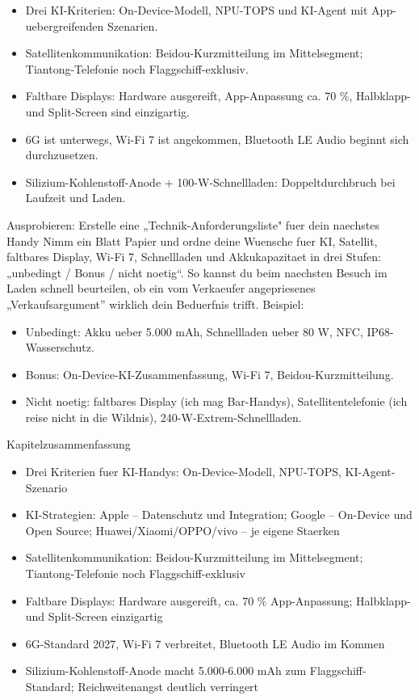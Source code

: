 
\begin{itemize}
  \item Drei KI-Kriterien: On-Device-Modell, NPU-TOPS und KI-Agent mit App-uebergreifenden Szenarien.
  \item Satellitenkommunikation: Beidou-Kurzmitteilung im Mittelsegment; Tiantong-Telefonie noch Flaggschiff-exklusiv.
  \item Faltbare Displays: Hardware ausgereift, App-Anpassung ca. 70 \%, Halbklapp- und Split-Screen sind einzigartig.
  \item 6G ist unterwegs, Wi-Fi 7 ist angekommen, Bluetooth LE Audio beginnt sich durchzusetzen.
  \item Silizium-Kohlenstoff-Anode + 100-W-Schnellladen: Doppeltdurchbruch bei Laufzeit und Laden.
\end{itemize}

\begin{tcbpractice}{Ausprobieren: Erstelle eine „Technik-Anforderungsliste" fuer dein naechstes Handy}
Nimm ein Blatt Papier und ordne deine Wuensche fuer KI, Satellit, faltbares Display, Wi-Fi 7, Schnellladen und Akkukapazitaet in drei Stufen: „unbedingt / Bonus / nicht noetig“. So kannst du beim naechsten Besuch im Laden schnell beurteilen, ob ein vom Verkaeufer angepriesenes „Verkaufsargument” wirklich dein Beduerfnis trifft. Beispiel:

\begin{itemize}
  \item Unbedingt: Akku ueber 5.000 mAh, Schnellladen ueber 80 W, NFC, IP68-Wasserschutz.
  \item Bonus: On-Device-KI-Zusammenfassung, Wi-Fi 7, Beidou-Kurzmitteilung.
  \item Nicht noetig: faltbares Display (ich mag Bar-Handys), Satellitentelefonie (ich reise nicht in die Wildnis), 240-W-Extrem-Schnellladen.
\end{itemize}

\end{tcbpractice}

\begin{tcbsummary}{Kapitelzusammenfassung}
\begin{itemize}
  \item Drei Kriterien fuer KI-Handys: On-Device-Modell, NPU-TOPS, KI-Agent-Szenario
  \item KI-Strategien: Apple – Datenschutz und Integration; Google – On-Device und Open Source; Huawei/Xiaomi/OPPO/vivo – je eigene Staerken
  \item Satellitenkommunikation: Beidou-Kurzmitteilung im Mittelsegment; Tiantong-Telefonie noch Flaggschiff-exklusiv
  \item Faltbare Displays: Hardware ausgereift, ca. 70 \% App-Anpassung; Halbklapp- und Split-Screen einzigartig
  \item 6G-Standard 2027, Wi-Fi 7 verbreitet, Bluetooth LE Audio im Kommen
  \item Silizium-Kohlenstoff-Anode macht 5.000-6.000 mAh zum Flaggschiff-Standard; Reichweitenangst deutlich verringert
\end{itemize}

\end{tcbsummary}
